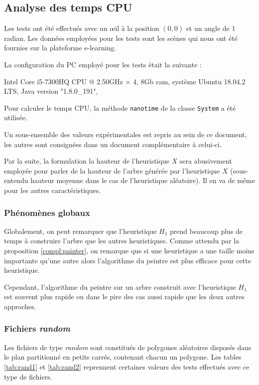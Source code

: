 \subsection{Analyse des temps CPU}
Les tests ont été effectués avec un \oe{}il à la position $(0,0)$ et un
angle de 1 radian. Les données employées pour les tests sont les scènes
qui nous ont été fournies sur la plateforme e-learning.

La configuration du PC employé pour les tests était la suivante :

\begin{center}
  Intel Core i5-7300HQ CPU @ 2.50GHz $\times$ 4,  8Gb ram, système Ubuntu 18.04.2 LTS,
  Java version "1.8.0\_191",
\end{center}
Pour calculer le temps CPU, la méthode \texttt{nanotime} de la classe
\texttt{System} a été utilisée.

Un sous-ensemble des valeurs expérimentales est repris au sein de
ce document, les autres sont consignées dans un document complémentaire
à celui-ci.

Par la suite, la formulation la hauteur de l'heuristique $X$ sera abusivement
employée pour parler de la hauteur de l'arbre générée par l'heuristique $X$
(sous-entendu hauteur moyenne dans le cas de l'heuristique aléatoire).
Il en va de même pour les autres caractéristiques.

\subsubsection*{Phénomènes globaux}
Globalement, on peut remarquer que l'heuristique $H_1$ prend beaucoup plus de
temps à construire l'arbre que les autres heuristiques.
Comme attendu par la proposition \ref{compl:painter}, on remarque
que si une heuristique a une taille moins importante qu'une autre
alors l'algorithme du peintre est plus efficace pour cette heuristique.

Cependant, l'algorithme du peintre sur un arbre construit
avec l'heuristique $H_1$ est souvent plus rapide ou dans le
pire des cas aussi rapide que les deux autres approches.

\subsubsection*{Fichiers \og\emph{random}\fg}
Les fichiers de type \og\emph{random}\fg{} sont constitués de polygones
aléatoires disposés dans le plan partitionné en petits carrés, contenant
chacun un polygone. Les tables \ref{tab:rand1} et \ref{tab:rand2} reprennent
certaines valeurs des tests effectués avec ce type de fichiers.

